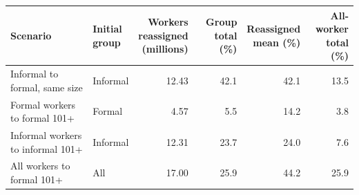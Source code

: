 \begin{tabular}{@{}>{\raggedright\arraybackslash}p{}lrrrr@{}}
\toprule
    Scenario & \shortstack[l]{Initial\\group} & \shortstack[r]{Workers\\reassigned\\(millions)} & \shortstack[r]{Group total\\(\%)} & \shortstack[r]{Reassigned\\mean (\%)} & \shortstack[r]{All-worker\\total (\%)} \\
    \midrule
Informal to formal, same size & Informal & 12.43 & 42.1 & 42.1 & 13.5 \\
Formal workers to formal 101+ & Formal & 4.57 & 5.5 & 14.2 & 3.8 \\
Informal workers to informal 101+ & Informal & 12.31 & 23.7 & 24.0 & 7.6 \\
\midrule
    All workers to formal 101+ & All & 17.00 & 25.9 & 44.2 & 25.9\\
\bottomrule\end{tabular}
